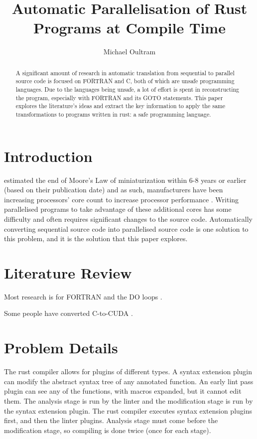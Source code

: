 \documentclass[conference]{IEEEtran}
\begin{document}
\title{Automatic Parallelisation of Rust Programs at Compile Time}

\author{Michael Oultram}

\maketitle

\begin{abstract}
  A significant amount of research in automatic translation from sequential to parallel source code is focused on FORTRAN and C, both of which are unsafe programming languages. Due to the languages being unsafe, a lot of effort is spent in reconstructing the program, especially with FORTRAN and its GOTO statements.
  This paper explores the literature's ideas and extract the key information to apply the same transformations to programs written in rust: a safe programming language.
\end{abstract}

\section{Introduction}
\textcite{Kish2002} estimated the end of Moore's Law of miniaturization within 6-8 years or earlier (based on their publication date) and as such, manufacturers have been increasing processors' core count to increase processor performance \parencite{Geer2005}. Writing parallelised programs to take advantage of these additional cores has some difficulty and often requires significant changes to the source code. Automatically converting sequential source code into parallelised source code is one solution to this problem, and it is the solution that this paper explores.

\section{Literature Review}
Most research is for FORTRAN and the DO loops \parencite{Banerjee1993}.


Some people have converted C-to-CUDA \parencite{Baskaran2010, Verdoolaege2013}.

\section{Problem Details} %
The rust compiler allows for plugins of different types. A syntax extension plugin can modify the abstract syntax tree of any annotated function. An early lint pass plugin can see any of the functions, with macros expanded, but it cannot edit them.  The analysis stage is run by the linter and the modification stage is run by the syntax extension plugin. The rust compiler executes syntax extension plugins first, and then the linter plugins. Analysis stage must come before the modification stage, so compiling is done twice (once for each stage).
\end{document}
